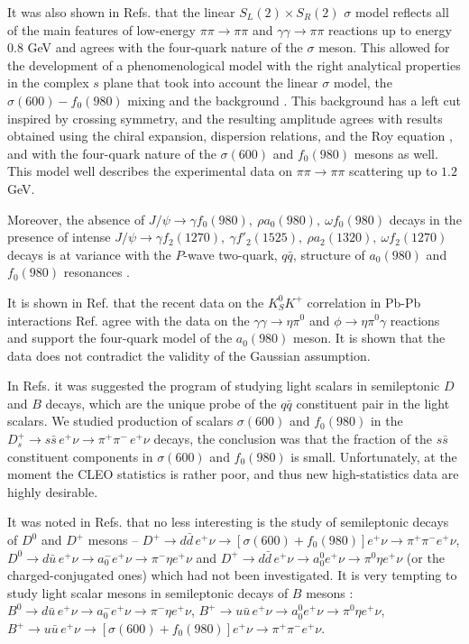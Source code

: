 \documentclass[aps,preprint,groupedaddress,floatfix]{revtex4}
\begin{document}
It was also shown in Refs. \cite{annshgn-94,annshgn-07} that the
linear $S_L(2)\times S_R(2)$ $\sigma$ model \cite{gellman}
reflects all of the main features of low-energy $\pi\pi\to\pi\pi$
and $\gamma\gamma\to\pi\pi$ reactions up to energy 0.8 GeV and
agrees with the four-quark nature of the $\sigma$ meson. This
allowed for the development of a phenomenological model with the
right analytical properties in the complex $s$ plane that took
into account the linear $\sigma$ model, the $\sigma(600)-f_0(980)$
mixing and the background \cite{our_f0_2011}. This background has
a left cut inspired by crossing symmetry, and the resulting
amplitude agrees with results obtained using the chiral expansion,
dispersion relations, and the Roy equation \cite{sigmaPole}, and
with the four-quark nature of the $\sigma(600)$ and $f_0(980)$
mesons as well. This model well describes the experimental data on
$\pi\pi\to\pi\pi$ scattering up to $1.2$ GeV.

Moreover, the absence of $J/\psi\to \gamma f_0(980),\ \rho
a_0(980),\ \omega f_0(980)$ decays in the presence of intense
$J/\psi\to \gamma f_2(1270),\ \gamma f'_2(1525),\ \rho a_2(1320),\
\omega f_2(1270)$ decays is at variance with the $P$-wave
two-quark, $q\bar q$, structure of $a_0(980)$ and $f_0(980)$
resonances \cite{achasov-1998}.

It is shown in Ref. \cite{correlation} that the recent data on the
$K^0_S K^+$ correlation in Pb-Pb interactions Ref.
\cite{alice-2017} agree with the data on the
$\gamma\gamma\to\eta\pi^0$ and $\phi\to\eta\pi^0\gamma$ reactions
and support the four-quark model of the $a_0(980)$ meson. It is
shown that the data does not contradict the validity of the
Gaussian assumption.

In Refs. \cite{dsdecay,dsdecayConf} it was suggested the program
of studying light scalars in semileptonic $D$ and $B$ decays,
which are the unique probe of the $q\bar q$ constituent pair in
the light scalars. We studied production of scalars $\sigma(600)$
and $f_0(980)$ in the $D_s^+\to s\bar s\, e^+\nu\to\pi^+\pi^-\,
e^+\nu$ decays, the conclusion was that the fraction of the $s\bar
s$ constituent components in $\sigma(600)$ and $f_0(980)$ is
small. Unfortunately, at the moment the CLEO statistics
 \cite{cleo} is rather poor, and thus new high-statistics data
are highly desirable.

It was noted in Refs. \cite{dsdecay,dsdecayConf} that no less
interesting is the study of semileptonic decays of $D^0$ and $D^+$
mesons -- $D^+\to d\bar d\, e^+\nu\to
[\sigma(600)+f_0(980)]e^+\nu\to \pi^+\pi^-e^+\nu$, $D^0\to d\bar
u\, e^+\nu\to a_0^-e^+\nu\to\pi^-\eta e^+\nu$ and $D^+\to d\bar
d\, e^+\nu\to a_0^0 e^+\nu\to\pi^0\eta e^+\nu$ (or the
charged-conjugated ones) which had not been investigated. It is
very tempting to study light scalar mesons in semileptonic decays
of $B$ mesons \cite{dsdecayConf}: $B^0\to d\bar u\, e^+\nu\to
a_0^-e^+\nu\to\pi^-\eta e^+\nu$, $B^+\to u\bar u\, e^+\nu\to a_0^0
e^+\nu\to\pi^0\eta e^+\nu$, $B^+\to u\bar u\, e^+\nu\to
[\sigma(600)+f_0(980)]e^+\nu\to \pi^+\pi^-e^+\nu$.
\end{document}
